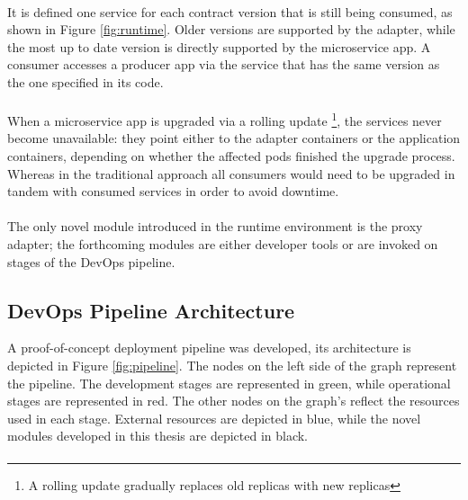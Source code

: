 \paragraph{}

It is defined one service for each contract version that is still being consumed, as shown in Figure \ref{fig:runtime}.
Older versions are supported by the adapter, while the most up to date version is directly supported by the microservice app.
A consumer accesses a producer app via the service that has the same version as the one specified in its code.

\paragraph{}

When a microservice app is upgraded via a rolling update \footnote{A rolling update gradually replaces old replicas with new replicas},
the services never become unavailable:
they point either to the adapter containers or the application containers, depending on whether the affected pods finished the upgrade process.
Whereas in the traditional approach all consumers would need to be upgraded in tandem with consumed services in order to avoid downtime.

\paragraph{}

The only novel module introduced in the runtime environment is the proxy adapter;
the forthcoming modules are either developer tools or are invoked on stages of the DevOps pipeline.

\subsection{DevOps Pipeline Architecture} %
\label{sec:devops_pipeline_architecture}

A proof-of-concept deployment pipeline was developed, its architecture is depicted in Figure \ref{fig:pipeline}.
The nodes on the left side of the graph represent the pipeline.
The development stages are represented in green, while operational stages are represented in red.
The other nodes on the graph's reflect the resources used in each stage.
External resources are depicted in blue, while the novel modules developed in this thesis are depicted in black.

\paragraph{}


